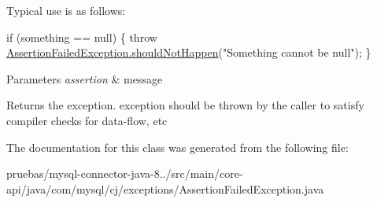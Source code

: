 Typical use is as follows\+:


\begin{DoxyPre}
if (something == null) \{
    throw \mbox{\hyperlink{classcom_1_1mysql_1_1cj_1_1exceptions_1_1_assertion_failed_exception_a357eac18cfa5a41a6fd49b3ee7af086c}{AssertionFailedException.shouldNotHappen}}("Something cannot be null");
\}
\end{DoxyPre}



\begin{DoxyParams}{Parameters}
{\em assertion} & message \\
\hline
\end{DoxyParams}
\begin{DoxyReturn}{Returns}
the exception. exception should be thrown by the caller to satisfy compiler checks for data-\/flow, etc 
\end{DoxyReturn}


The documentation for this class was generated from the following file\+:\begin{DoxyCompactItemize}
\item 
pruebas/mysql-\/connector-\/java-\/8../src/main/core-\/api/java/com/mysql/cj/exceptions/Assertion\+Failed\+Exception.\+java\end{DoxyCompactItemize}
